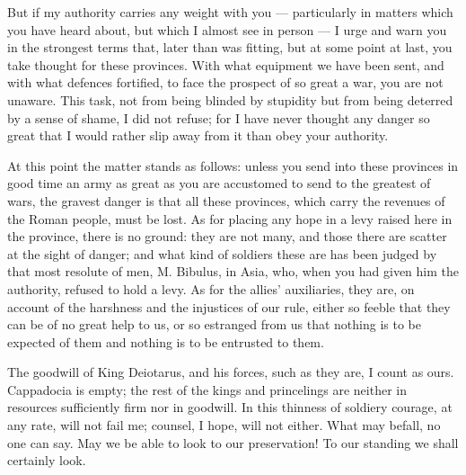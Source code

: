  But if my authority carries any weight with you --- particularly in matters which you have heard about, but which I almost see in person --- I urge and warn you in the strongest terms that, later than was fitting, but at some point at last, you take thought for these provinces. With what equipment we have been sent, and with what defences fortified, to face the prospect of so great a war, you are not unaware. This task, not from being blinded by stupidity but from being deterred by a sense of shame, I did not refuse; for I have never thought any danger so great that I would rather slip away from it than obey your authority.

 At this point the matter stands as follows: unless you send into these provinces in good time an army as great as you are accustomed to send to the greatest of wars, the gravest danger is that all these provinces, which carry the revenues of the Roman people, must be lost. As for placing any hope in a levy raised here in the province, there is no ground: they are not many, and those there are scatter at the sight of danger; and what kind of soldiers these are has been judged by that most resolute of men, M. Bibulus, in Asia, who, when you had given him the authority, refused to hold a levy. As for the allies' auxiliaries, they are, on account of the harshness and the injustices of our rule, either so feeble that they can be of no great help to us, or so estranged from us that nothing is to be expected of them and nothing is to be entrusted to them.

 The goodwill of King Deiotarus, and his forces, such as they are, I count as ours. Cappadocia is empty; the rest of the kings and princelings are neither in resources sufficiently firm nor in goodwill. In this thinness of soldiery courage, at any rate, will not fail me; counsel, I hope, will not either. What may befall, no one can say. May we be able to look to our preservation! To our standing we shall certainly look.

